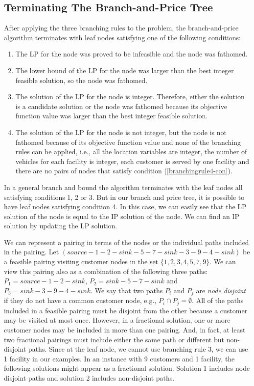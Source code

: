 \subsection {Terminating The Branch-and-Price Tree}
\label{BPAlg-Opt}
After applying the three branching rules to the problem, the  
branch-and-price algorithm terminates with leaf nodes satisfying one of the 
following conditions:
\begin{enumerate}
\item The LP for the node was proved to be infeasible and the node was fathomed.
\item The lower bound of the LP for the node was larger than the best integer feasible 
  solution, so the node was fathomed. 
\item The solution of the LP for the node is integer. Therefore, either the solution is a candidate 
  solution or the node was fathomed because its objective function value was larger than 
  the best integer feasible solution.  
\item The solution of the LP for the node is not integer, but the node is not fathomed 
  because of its objective function value and none of the branching rules can be 
  applied, i.e., all the location variables are integer, the number of vehicles
  for each facility is integer, each customer is served by one facility and there 
are no pairs of nodes that   satisfy condition (\ref{branchingrule4-con}).
\end{enumerate}

In a general branch and bound the algorithm terminates with the leaf nodes all 
satisfying conditions 1, 2 or 3. But in our branch and price tree, 
it is possible to  have leaf nodes satisfying condition 4. 
In this case, we can easily see that the LP solution of the node is equal to
the IP solution of the node. We can find an IP solution by updating the LP solution. 

We can represent a pairing in terms of the nodes or the individual paths included in the 
pairing. Let $(source-1-2-sink-5-7-sink-3-9-4-sink)$ be a feasible pairing visiting 
customer nodes in the set $\{1,2,3,4,5,7,9\}$. We can view this pairing also as a 
combination of the following three paths: $P_1=source-1-2-sink$, $P_2=sink-5-7-sink$ and 
$P_3=sink-3-9-4-sink$. We say that two paths $P_i$ and $P_j$ are {\em node disjoint} if they do not have a 
common customer node, e.g., $P_i\cap P_j =\emptyset$. All of the paths included in a 
feasible pairing must be disjoint from the other because a customer may be visited
at most once. However, in a fractional solution, one or more customer nodes may 
be included in more than one pairing. And, in fact, at least two fractional pairings 
must include either the same path or different but non-disjoint paths. 
Since at the leaf node, we cannot use branching rule 3, we can use 1 facility
in our examples. In an instance with 9 customers and 1 facility, the following solutions might
appear as a fractional solution. Solution 1 includes node disjoint  paths and solution 2 includes
non-disjoint paths.   


